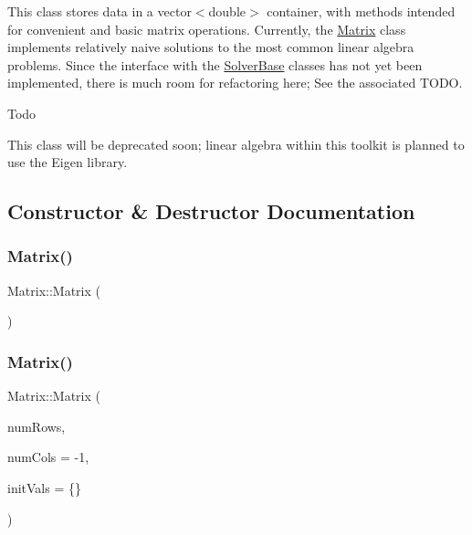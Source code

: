 This class stores data in a vector$<$double$>$ container, with methods intended for convenient and basic matrix operations. Currently, the \mbox{\hyperlink{class_matrix}{Matrix}} class implements relatively naive solutions to the most common linear algebra problems. Since the interface with the \mbox{\hyperlink{class_solver_base}{Solver\+Base}} classes has not yet been implemented, there is much room for refactoring here; See the associated T\+O\+DO. \begin{DoxyRefDesc}{Todo}
\item[\mbox{\hyperlink{todo__todo000006}{Todo}}]This class will be deprecated soon; linear algebra within this toolkit is planned to use the Eigen library. \end{DoxyRefDesc}


\subsection{Constructor \& Destructor Documentation}
\mbox{\label{class_matrix_a2dba13c45127354c9f75ef576f49269b}} 
\subsubsection{\texorpdfstring{Matrix()}{Matrix()}\hspace{0.1cm}{\footnotesize\ttfamily [1/2]}}
{\footnotesize\ttfamily Matrix\+::\+Matrix (\begin{DoxyParamCaption}{ }\end{DoxyParamCaption})}

\mbox{\label{class_matrix_a4b4b9ae88079c441a7acc781fdbaa032}} 
\subsubsection{\texorpdfstring{Matrix()}{Matrix()}\hspace{0.1cm}{\footnotesize\ttfamily [2/2]}}
{\footnotesize\ttfamily Matrix\+::\+Matrix (\begin{DoxyParamCaption}\item[{int}]{num\+Rows,  }\item[{int}]{num\+Cols = {\ttfamily -\/1},  }\item[{std\+::vector$<$ double $>$}]{init\+Vals = {\ttfamily \{\}} }\end{DoxyParamCaption})}



